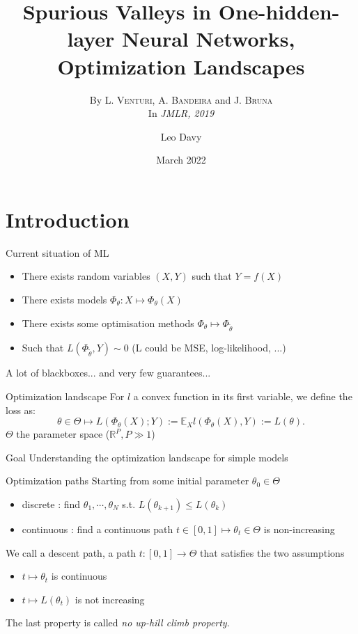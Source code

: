 \documentclass{beamer}
\title[Optimization landscape and spurious valleys]{Spurious Valleys in One-hidden-layer Neural Networks, Optimization Landscapes}
\subtitle{By L. \textsc{Venturi}, A. \textsc{Bandeira} and J. \textsc{Bruna}\\
In \emph{JMLR, 2019}}
\author[Davy] %
{Leo Davy}
\institute[ENS Lyon] %
{
  ENS Lyon \\
  M2 Advanced Mathematics}
\date[Short Occasion] %
{March 2022}
\begin{document}
\maketitle

\section{Introduction}


\begin{frame}{Current situation of ML}
	\begin{itemize}
		\item There exists random variables $(X, Y)$ such that $Y = f(X)$
		\item There exists models $\Phi_\theta : X \mapsto \Phi_\theta(X)$
		\item There exists some optimisation methods $\Phi_\theta \mapsto \Phi_{\tilde\theta}$
		\item Such that $L(\Phi_{\tilde\theta}, Y) \sim 0$ (L could be MSE, log-likelihood, ...)
	\end{itemize}
	A lot of blackboxes... and very few guarantees...
\end{frame}

\begin{frame}{Optimization landscape}
	For $l$ a convex function in its first variable, we define the loss as: 
	$$\theta\in\Theta \mapsto L(\Phi_\theta(X); Y) := \mathbb{E}_X l(\Phi_\theta(X), Y) := L(\theta).$$
	$\Theta$ the parameter space ($\mathbb{R}^P, P\gg 1$)
	\begin{block}{Goal}
		Understanding the optimization landscape for simple models
	\end{block}
\end{frame}


\begin{frame}{Optimization paths}
	Starting from some initial parameter $\theta_0 \in \Theta$ 
		\begin{itemize}
			\item discrete : find $\theta_1, \cdots, \theta_N$ s.t. $L(\theta_{k+1}) \leq L(\theta_k)$
			\item continuous : find a continuous path $t\in [0,1]\mapsto \theta_t \in\Theta$ is non-increasing
		\end{itemize}
	\begin{definition}
		We call a descent path, a path $t:[0,1] \to \Theta$ that satisfies the two assumptions
			\begin{itemize}
				\item $t \mapsto \theta_t$ is continuous
				\item $t \mapsto L(\theta_t)$ is not increasing
			\end{itemize}
	\end{definition}
	The last property is called \emph{no up-hill climb property}.
\end{frame}
\end{document}

